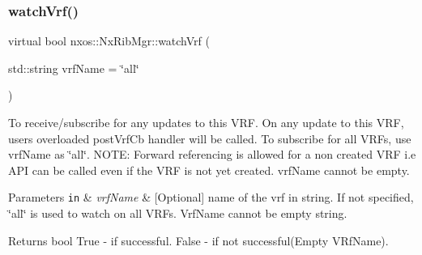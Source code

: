 \subsubsection{\texorpdfstring{watch\+Vrf()}{watchVrf()}}
{\footnotesize\ttfamily virtual bool nxos\+::\+Nx\+Rib\+Mgr\+::watch\+Vrf (\begin{DoxyParamCaption}\item[{std\+::string}]{vrf\+Name = {\ttfamily \char`\"{}all\char`\"{}} }\end{DoxyParamCaption})\hspace{0.3cm}{\ttfamily [pure virtual]}}

To receive/subscribe for any updates to this V\+RF. On any update to this V\+RF, users overloaded post\+Vrf\+Cb handler will be called. To subscribe for all V\+R\+Fs, use vrf\+Name as \char`\"{}all\char`\"{}. N\+O\+TE\+: Forward referencing is allowed for a non created V\+RF i.\+e A\+PI can be called even if the V\+RF is not yet created. vrf\+Name cannot be empty. 
\begin{DoxyParams}[1]{Parameters}
\mbox{\tt in}  & {\em vrf\+Name} & \mbox{[}Optional\mbox{]} name of the vrf in string. If not specified, \char`\"{}all\char`\"{} is used to watch on all V\+R\+Fs. Vrf\+Name cannot be empty string. \\
\hline
\end{DoxyParams}
\begin{DoxyReturn}{Returns}
bool True -\/ if successful. False -\/ if not successful(\+Empty V\+Rf\+Name).
\end{DoxyReturn}

